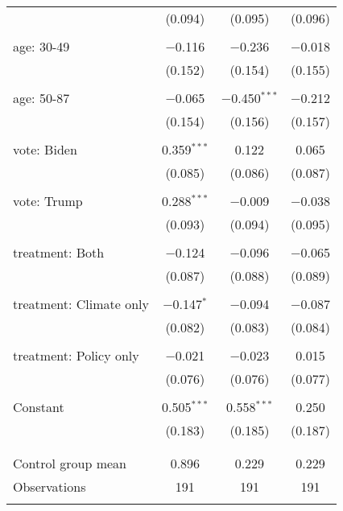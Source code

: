 \begin{tabular}{@{\extracolsep{5pt}}lccc}
  & (0.094) & (0.095) & (0.096) \\ 
  & & & \\ 
 age: 30-49 & $-$0.116 & $-$0.236 & $-$0.018 \\ 
  & (0.152) & (0.154) & (0.155) \\ 
  & & & \\ 
 age: 50-87 & $-$0.065 & $-$0.450$^{***}$ & $-$0.212 \\ 
  & (0.154) & (0.156) & (0.157) \\ 
  & & & \\ 
 vote: Biden & 0.359$^{***}$ & 0.122 & 0.065 \\ 
  & (0.085) & (0.086) & (0.087) \\ 
  & & & \\ 
 vote: Trump & 0.288$^{***}$ & $-$0.009 & $-$0.038 \\ 
  & (0.093) & (0.094) & (0.095) \\ 
  & & & \\ 
 treatment: Both & $-$0.124 & $-$0.096 & $-$0.065 \\ 
  & (0.087) & (0.088) & (0.089) \\ 
  & & & \\ 
 treatment: Climate only & $-$0.147$^{*}$ & $-$0.094 & $-$0.087 \\ 
  & (0.082) & (0.083) & (0.084) \\ 
  & & & \\ 
 treatment: Policy only & $-$0.021 & $-$0.023 & 0.015 \\ 
  & (0.076) & (0.076) & (0.077) \\ 
  & & & \\ 
 Constant & 0.505$^{***}$ & 0.558$^{***}$ & 0.250 \\ 
  & (0.183) & (0.185) & (0.187) \\ 
  & & & \\ 
\hline \\[-1.8ex] 
Control group mean & 0.896 & 0.229 & 0.229 \\ 
Observations & 191 & 191 & 191 \\ 
\hline 
\hline \\[-1.8ex] 
\end{tabular} 
